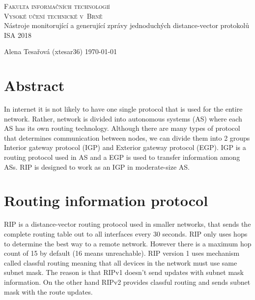 \documentclass[11pt,a4paper]{article}
\author{Alena Tesařová}
\begin{document}
\begin{titlepage}

\begin{center}
\Huge
\textsc{Fakulta informačních technologií\\
Vysoké učení technické v~Brně}\\
\Huge Nástroje monitorující a generující zprávy jednoduchých distance-vector protokolů
\\
\medskip
{\Large ISA 2018}
\end{center}


\begin{LARGE}
\noindent

\end{LARGE}
{\Large 
Alena Tesařová (xtesar36)
}
\hfill
{\Large 
\today
}
\end{titlepage}




\section{Abstract}
In internet it is not likely to have one single protocol that is used for the entire network. Rather, network is divided into autonomous systems (AS) where each AS has its own routing technology. Although there are many types of protocol that determines communication between nodes, we can divide them into 2 groups Interior gateway protocol (IGP) and Exterior gateway protocol (EGP). IGP is a routing protocol used in AS and a EGP is used to transfer information among ASs. RIP is designed to work as an IGP in moderate-size AS.  

\section{Routing information protocol}
RIP is a distance-vector routing protocol used in smaller networks, that sends the complete routing table out to all interfaces every 30 seconds. RIP only uses hops to determine the best way to a remote network. However there is a maximum hop count of 15 by default (16 means unreachable). RIP version 1 uses mechanism called classful routing meaning that all devices in the network must use same subnet mask. The reason is that RIPv1 doesn't send updates with subnet mask information. On the other hand RIPv2 provides classful routing and sends subnet mask with the route updates\cite{book}.
\end{document}
